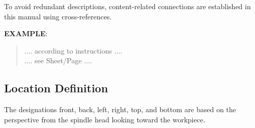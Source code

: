 To avoid redundant descriptions, content-related connections are established in this manual using cross-references.

\textbf{EXAMPLE}:
\begin{quote}
\noindent \hspace{-0.25cm} .... according to instructions .... \\
\hspace{1.3cm} .... see Sheet/Page ....
\end{quote}

\subsection{Location Definition}

The designations front, back, left, right, top, and bottom are based on the perspective from the spindle head looking toward the workpiece.

\renewcommand{\arraystretch}{1.3} %

